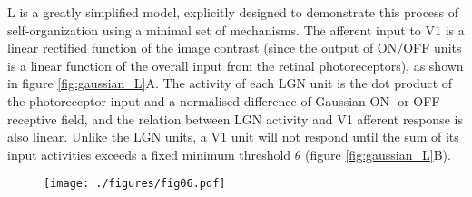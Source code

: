 \documentclass{article}
\def \scalefactor {0.666666}
\def \GaussianScale {\scalefactor}         %
\begin{document}
L is a greatly simplified model, explicitly designed to demonstrate
this process of self-organization using a minimal set of mechanisms.
The afferent input to V1 is a linear rectified function of the image
contrast (since the output of ON/OFF units is a linear function of the
overall input from the retinal photoreceptors), as shown in figure
\ref{fig:gaussian_L}A.  The activity of each LGN unit is the dot
product of the photoreceptor input and a normalised
difference-of-Gaussian ON- or OFF- receptive field, and the relation
between LGN activity and V1 afferent response is also linear. Unlike
the LGN units, a V1 unit will not respond until the sum of its input
activities exceeds a fixed minimum threshold $\theta$ (figure
\ref{fig:gaussian_L}B).
\begin{figure}
\centerline{
\texttt{[image: ./figures/fig06.pdf]}
}


\end{figure}
\end{document}
